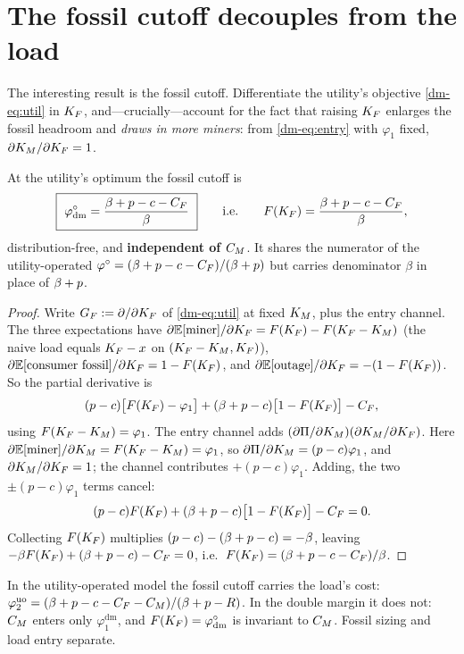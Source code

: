 \section{The fossil cutoff decouples from the load}
The interesting result is the fossil cutoff. Differentiate the utility's objective
\eqref{dm-eq:util} in $K_F$, and---crucially---account for the fact that raising $K_F$ enlarges
the fossil headroom and \emph{draws in more miners}: from \eqref{dm-eq:entry} with $\varphi_1$
fixed, $\partial K_M/\partial K_F=1$.

\begin{theorem}\label{dm-thm:phiodm}
At the utility's optimum the fossil cutoff is
\[
  \boxed{\ \phio_{\mathrm{dm}}=\frac{\bp-c-\CF}{\beta}\ }
  \qquad\text{i.e.}\qquad F(\KF)=\frac{\bp-c-\CF}{\beta},
\]
distribution-free, and \textbf{independent of $C_M$}. It shares the numerator of the
utility-operated $\varphi^{\circ}=(\beta+p-c-C_F)/(\beta+p)$ but carries denominator $\beta$ in place of $\beta+p$.
\end{theorem}
\begin{proof}
Write $G_F:=\partial/\partial K_F$ of \eqref{dm-eq:util} at fixed $K_M$, plus the entry channel.
The three expectations have
$\partial\mathbb{E}[\text{miner}]/\partial K_F=F(K_F)-F(K_F-K_M)$ (the naive load equals $K_F-x$ on
$(K_F-K_M,K_F)$), $\partial\mathbb{E}[\text{consumer fossil}]/\partial K_F=1-F(K_F)$, and
$\partial\mathbb{E}[\text{outage}]/\partial K_F=-(1-F(K_F))$. So the partial derivative is
\[
  (p-c)\big[F(K_F)-\varphi_1\big]+(\beta+p-c)\big[1-F(K_F)\big]-C_F ,
\]
using $F(K_F-K_M)=\varphi_1$. The entry channel adds $(\partial\Pi/\partial K_M)(\partial K_M/\partial K_F)$.
Here $\partial\mathbb{E}[\text{miner}]/\partial K_M=F(K_F-K_M)=\varphi_1$, so
$\partial\Pi/\partial K_M=(p-c)\varphi_1$, and $\partial K_M/\partial K_F=1$; the channel
contributes $+(p-c)\varphi_1$. Adding, the two $\pm(p-c)\varphi_1$ terms cancel:
\[
  (p-c)F(K_F)+(\beta+p-c)\big[1-F(K_F)\big]-C_F=0 .
\]
Collecting $F(K_F)$ multiplies $(p-c)-(\beta+p-c)=-\beta$, leaving
$-\beta F(K_F)+(\beta+p-c)-C_F=0$, i.e.\ $F(K_F)=(\beta+p-c-C_F)/\beta$.
\end{proof}

\begin{corollary}\label{dm-cor:decouple}
In the utility-operated model the fossil cutoff carries the load's cost:
$\varphi_2^{\mathrm{uo}}=(\beta+p-c-C_F-C_M)/(\beta+p-R)$. In the double margin it does not:
$C_M$ enters only $\varphi_1^{\mathrm{dm}}$, and $F(K_F)=\varphi^{\circ}_{\mathrm{dm}}$ is invariant to
$C_M$. Fossil sizing and load entry separate.
\end{corollary}

